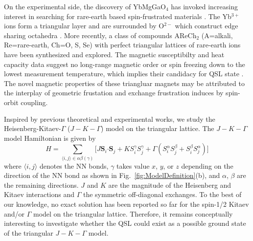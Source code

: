 \documentclass[aps,prb,reprint,amsfonts,amsmath,amssymb,showpacs,groupedaddress,superscriptaddress]{revtex4-1}
\begin{document}
On the experimental side, the discovery of YbMgGaO$_4$ has invoked increasing interest in searching for rare-earth based spin-frustrated materials \cite{srep16419,PhysRevLett.115.167203,PhysRevB.94.035107,PhysRevB.96.054445,PhysRevB.97.184413,PhysRevB.97.125105,PhysRevB.96.075105,PhysRevLett.119.157201}. The Yb$^{3+}$ ions form a triangular layer and are surrounded by O$^{2-}$ which construct edge sharing octahedra \cite{srep16419,PhysRevLett.115.167203}. More recently, a class of compounds AReCh$_2$ (A=alkali, Re=rare-earth, Ch=O, S, Se) with perfect triangular lattices of rare-earth ions have been synthesized and explored. The magnetic susceptibilty and heat capacity data suggest no long-range magnetic order or spin freezing down to the lowest measurement temperature, which implies their candidacy for QSL state \cite{acsmaterialslett.9b00464,PhysRevMaterials.3.114413,arXiv1911.08036,Liu_2018,arXiv1911.12712}. The novel magnetic properties of these triangluar magnets may be attributed to the interplay of geometric frustation and exchange frustration induces by spin-orbit coupling.

Inspired by previous theoretical and experimental works, we study the Heisenberg-Kitaev-$\Gamma$ ($J-K-\Gamma$) model on the triangular lattice. The $J-K-\Gamma$ model Hamiltonian is given by
\begin{equation}
    H=\sum_{\langle i,j \rangle \in \alpha \beta (\gamma)} \lbrack J \bm{S}_i \bm{\cdot} \bm{S}_j + K S_i^{\gamma} S_j^{\gamma} + \Gamma (S_i^{\alpha} S_j^{\beta} + S_i^{\beta} S_j^{\alpha}) \rbrack \label{eq:Hamiltonian}
\end{equation}
where $\langle i,j \rangle$ denotes the NN bonds, $\gamma$ takes value $x$, $y$, or $z$ depending on the direction of the NN bond as shown in Fig.~\ref{fig:ModelDefinition}(b), and $\alpha$, $\beta$ are the remaining directions. $J$ and $K$ are the magnitude of the Heisenberg and Kitaev interactions and $\Gamma$ the symmetric off-diagonal exchanges. To the best of our knowledge, no exact solution has been reported so far for the spin-1/2 Kitaev and/or $\Gamma$ model on the triangular lattice. Therefore, it remains conceptually interesting to investigate whether the QSL could exist as a possible ground state of the triangular $J-K-\Gamma$ model.
\end{document}
